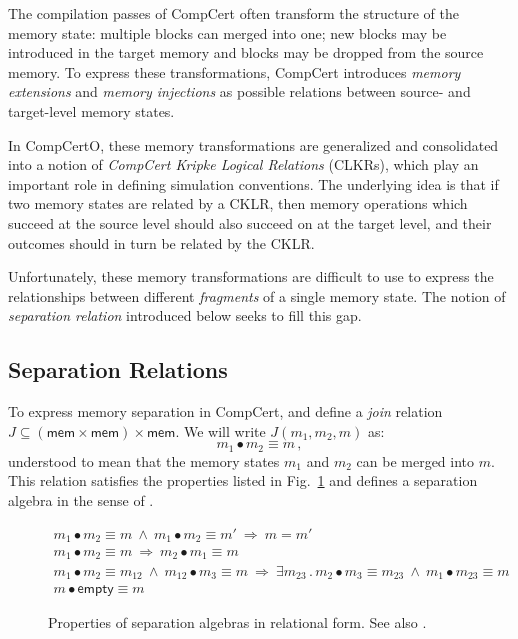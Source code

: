 \documentclass[acmsmall,screen,review,anonymous]{acmart}
\newcommand{\kw}[1]{\ensuremath{ \mathsf{#1} }}
\begin{document}
The compilation passes of CompCert
often transform the structure of the memory state:
multiple blocks can merged into one;
new blocks may be introduced in the target memory
and blocks may be dropped from the source memory.
To express these transformations,
CompCert introduces \emph{memory extensions} and \emph{memory injections}
as possible relations between source- and target-level memory states.

In CompCertO,
these memory transformations are generalized and consolidated
into a notion of \emph{CompCert Kripke Logical Relations} (CLKRs),
which play an important role in defining simulation conventions.
The underlying idea is that
if two memory states are related by a CKLR,
then memory operations which succeed at the source level
should also succeed on at the target level,
and their outcomes should in turn be related
by the CKLR.

Unfortunately,
these memory transformations are difficult to use
to express the relationships between
different \emph{fragments} of a single memory state.
The notion of \emph{separation relation} introduced below
seeks to fill this gap.

\subsection{Separation Relations} %

To express memory separation in CompCert,
and define a \emph{join} relation
$J \subseteq (\kw{mem} \times \kw{mem}) \times \kw{mem}$.
We will write $J(m_1, m_2, m)$ as:
\[
  m_1 \bullet m_2 \equiv m
  \,,
\]
understood to mean that
the memory states $m_1$ and $m_2$
can be merged into $m$.
This relation satisfies the properties listed in Fig.~\ref{fig:sepalg}
and defines a separation algebra in the sense of \citet{freshlook}.

\begin{figure}
  \begin{gather*}
    m_1 \bullet m_2 \equiv m \:\wedge\:
      m_1 \bullet m_2 \equiv m' \:\Rightarrow\:
      m = m'
      \\
    m_1 \bullet m_2 \equiv m \:\Rightarrow\:
      m_2 \bullet m_1 \equiv m
      \\
    m_1 \bullet m_2 \equiv m_{12} \:\wedge\:
      m_{12} \bullet m_3 \equiv m \:\Rightarrow\:
      \exists m_{23} \mathrel.
      m_2 \bullet m_3 \equiv m_{23} \:\wedge\:
      m_1 \bullet m_{23} \equiv m
      \\
    m \bullet \kw{empty} \equiv m
  \end{gather*}
  \caption{Properties of separation algebras
    in relational form. See also \citet{freshlook}.}
  \label{fig:sepalg}
\end{figure}
\end{document}
